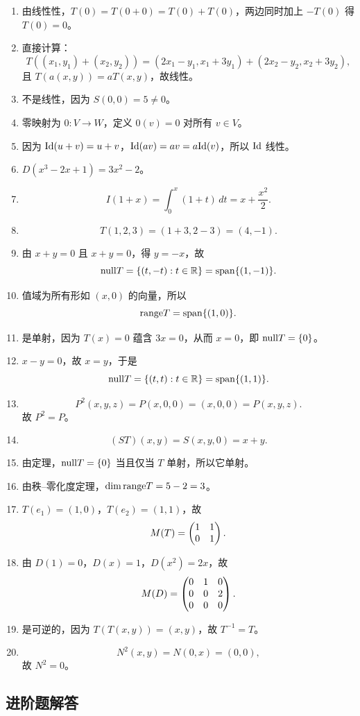 \begin{enumerate}[label=\basic\ \arabic*., leftmargin=*] \item
由线性性，$T(0)=T(0+0)=T(0)+T(0)$，两边同时加上 $-T(0)$ 得 $T(0)=0$。 \item 直接计算： \[
T((x_1,y_1)+(x_2,y_2))=(2x_1-y_1, x_1+3y_1)+(2x_2-y_2, x_2+3y_2), \] 且
$T(a(x,y))=aT(x,y)$，故线性。 \item 不是线性，因为 $S(0,0)=5\neq 0$。 \item 零映射为 $0:V\to W$，定义
$0(v)=0$ 对所有 $v\in V$。 \item 因为 $\mathrm{Id}(u+v)=u+v$，$\mathrm{Id}(av)=av=a\mathrm{Id}(v)$，所以 $\mathrm{Id}$ 线性。 \item
$D(x^3-2x+1)=3x^2-2$。 \item \[ I(1+x)=\int_0^x (1+t)\,dt=x+\frac{x^2}{2}. \] \item \[
T(1,2,3)=(1+3,2-3)=(4,-1). \] \item 由 $x+y=0$ 且 $x+y=0$，得 $y=-x$，故 \[ \mathrm{null}
T=\{(t,-t):t\in\mathbb{R}\}=\operatorname{span}\{(1,-1)\}. \] \item 值域为所有形如 $(x,0)$ 的向量，所以 \[ \mathrm{range}
T=\operatorname{span}\{(1,0)\}. \] \item 是单射，因为 $T(x)=0$ 蕴含 $3x=0$，从而 $x=0$，即 $\mathrm{null} T=\{0\}$。 \item
$x-y=0$，故 $x=y$，于是 \[ \mathrm{null} T=\{(t,t):t\in\mathbb{R}\}=\operatorname{span}\{(1,1)\}. \] \item \[
P^2(x,y,z)=P(x,0,0)=(x,0,0)=P(x,y,z). \] 故 $P^2=P$。 \item \[ (ST)(x,y)=S(x,y,0)=x+y. \]
\item 由定理，$\mathrm{null} T=\{0\}$ 当且仅当 $T$ 单射，所以它单射。 \item 由秩--零化度定理，$\dim \mathrm{range} T=5-2=3$。 \item
$T(e_1)=(1,0)$，$T(e_2)=(1,1)$，故 \[ M(T)=\begin{pmatrix} 1 & 1\\ 0 & 1 \end{pmatrix}. \] \item 由
$D(1)=0$，$D(x)=1$，$D(x^2)=2x$，故 \[ M(D)=\begin{pmatrix} 0 & 1 & 0\\ 0 & 0 & 2\\ 0 & 0 & 0 \end{pmatrix}. \]
\item 是可逆的，因为 $T(T(x,y))=(x,y)$，故 $T^{-1}=T$。 \item \[ N^2(x,y)=N(0,x)=(0,0), \] 故
$N^2=0$。 \end{enumerate}

\subsection*{进阶题解答}

